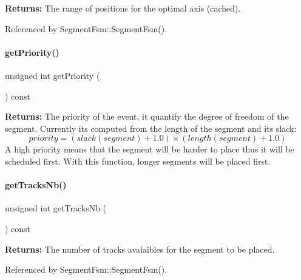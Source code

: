 {\bfseries Returns\+:} The range of positions for the optimal axis (cached). 

Referenced by Segment\+Fsm\+::\+Segment\+Fsm().

\mbox{\label{classKite_1_1RoutingEvent_a391dd4b2a826c1d4713ef24ba25f687a}} 
\paragraph{\texorpdfstring{get\+Priority()}{getPriority()}}
{\footnotesize\ttfamily unsigned int get\+Priority (\begin{DoxyParamCaption}{ }\end{DoxyParamCaption}) const\hspace{0.3cm}{\ttfamily [inline]}}

{\bfseries Returns\+:} The priority of the event, it quantify the degree of freedom of the segment. Currently it\textquotesingle{}s computed from the length of the segment and it\textquotesingle{}s slack\+: \[ priority = (slack(segment)+1.0) \times (length(segment)+1.0) \] A high priority means that the segment will be harder to place thus it will be scheduled first. With this function, longer segments will be placed first. \mbox{\label{classKite_1_1RoutingEvent_acd1128e75a441b654e6d881c495db4f7}} 
\paragraph{\texorpdfstring{get\+Tracks\+Nb()}{getTracksNb()}}
{\footnotesize\ttfamily unsigned int get\+Tracks\+Nb (\begin{DoxyParamCaption}{ }\end{DoxyParamCaption}) const\hspace{0.3cm}{\ttfamily [inline]}}

{\bfseries Returns\+:} The number of tracks avalaibles for the segment to be placed. 

Referenced by Segment\+Fsm\+::\+Segment\+Fsm().

\mbox{\label{classKite_1_1RoutingEvent_a00f02910915e7deb857f023e5d584c08}} 
